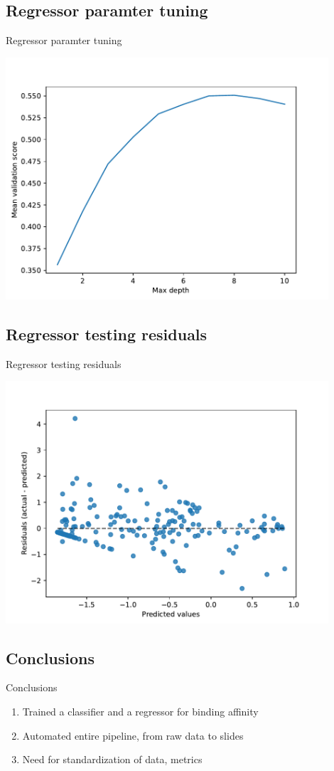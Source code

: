 \documentclass{beamer}
\begin{document}
\subsection{Regressor paramter tuning}
\begin{frame}{Regressor paramter tuning}

\includegraphics[width=0.9\textwidth]{../outputs/forest_regressor_validation.pdf}
    
\end{frame}
    

\subsection{Regressor testing residuals}
\begin{frame}{Regressor testing residuals}

\includegraphics[width=0.9\textwidth]{../outputs/test_regression_plot.pdf}
    
\end{frame}
    

\subsection{Conclusions}
\begin{frame}{Conclusions}

\begin{enumerate}
    \item Trained a classifier and a regressor for binding affinity
    \item Automated entire pipeline, from raw data to slides
    \item Need for standardization of data, metrics
\end{enumerate}
    
\end{frame}
    
\end{document}
